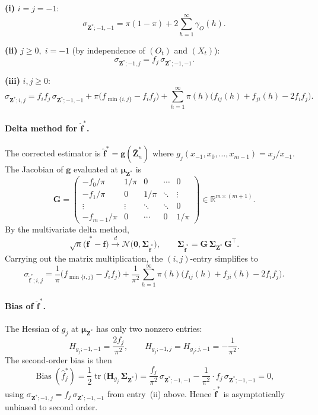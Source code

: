 \documentclass[12pt,a4paper]{scrreprt}
\DeclareMathOperator{\Bias}{Bias}
\begin{document}
\medskip
\noindent\textbf{(i)} $i = j = -1$:
\[
    \sigma_{\mathbf{Z}^{*};-1,-1}
    = \pi(1-\pi) + 2\sum_{h=1}^{\infty}\gamma_O(h).
\]

\noindent\textbf{(ii)} $j \geq 0,\; i = -1$ (by independence of $(O_t)$ and $(X_t)$):
\[
    \sigma_{\mathbf{Z}^{*};-1,j}
    = f_j\,\sigma_{\mathbf{Z}^{*};-1,-1}.
\]

\noindent\textbf{(iii)} $i, j \geq 0$:
\[
    \sigma_{\mathbf{Z}^{*};i,j}
    = f_i f_j\,\sigma_{\mathbf{Z}^{*};-1,-1}
    + \pi\bigl(f_{\min\{i,j\}} - f_i f_j\bigr)
    + \sum_{h=1}^{\infty}\pi(h)\bigl(f_{ij}(h) + f_{ji}(h) - 2f_i f_j\bigr).
\]

\paragraph{Delta method for $\hat{\mathbf{f}}^{*}$.}
The corrected estimator is $\hat{\mathbf{f}}^{*} = \mathbf{g}(\bar{\mathbf{Z}}_n^{*})$ where
$g_j(x_{-1}, x_0, \ldots, x_{m-1}) = x_j / x_{-1}$. The Jacobian of $\mathbf{g}$ evaluated
at $\boldsymbol{\mu}_{\mathbf{Z}^{*}}$ is
\[
    \mathbf{G} =
    \begin{pmatrix}
        -f_0/\pi    & 1/\pi  & 0      & \cdots & 0      \\
        -f_1/\pi    & 0      & 1/\pi  & \ddots & \vdots \\
        \vdots      & \vdots & \ddots & \ddots & 0      \\
        -f_{m-1}/\pi& 0      & \cdots & 0      & 1/\pi
    \end{pmatrix}
    \in \mathbb{R}^{m \times (m+1)}.
\]
By the multivariate delta method,
\[
    \sqrt{n}\bigl(\hat{\mathbf{f}}^{*} - \mathbf{f}\bigr)
    \xrightarrow{d} \mathcal{N}\bigl(\mathbf{0}, \boldsymbol{\Sigma}_{\hat{\mathbf{f}}^{*}}\bigr),
    \qquad
    \boldsymbol{\Sigma}_{\hat{\mathbf{f}}^{*}} = \mathbf{G}\,\boldsymbol{\Sigma}_{\mathbf{Z}^{*}}\,\mathbf{G}^{\top}.
\]
Carrying out the matrix multiplication, the $(i,j)$-entry simplifies to
\[
    \sigma_{\hat{\mathbf{f}}^{*};i,j}
    = \frac{1}{\pi}\bigl(f_{\min\{i,j\}} - f_i f_j\bigr)
    + \frac{1}{\pi^2}\sum_{h=1}^{\infty}\pi(h)
    \bigl(f_{ij}(h) + f_{ji}(h) - 2f_i f_j\bigr).
\]

\paragraph{Bias of $\hat{\mathbf{f}}^{*}$.}
The Hessian of $g_j$ at $\boldsymbol{\mu}_{\mathbf{Z}^{*}}$ has only two nonzero entries:
\[
    H_{g_j;-1,-1} = \frac{2f_j}{\pi^2}, \qquad
    H_{g_j;-1,j} = H_{g_j;j,-1} = -\frac{1}{\pi^2}.
\]
The second-order bias is then
\[
    \Bias(\hat{f}_j^{*})
    = \frac{1}{2}\operatorname{tr}\bigl(\mathbf{H}_{g_j}\,\boldsymbol{\Sigma}_{\mathbf{Z}^{*}}\bigr)
    = \frac{f_j}{\pi^2}\,\sigma_{\mathbf{Z}^{*};-1,-1}
    - \frac{1}{\pi^2}\cdot f_j\,\sigma_{\mathbf{Z}^{*};-1,-1}
    = 0,
\]
using $\sigma_{\mathbf{Z}^{*};-1,j} = f_j\,\sigma_{\mathbf{Z}^{*};-1,-1}$ from entry~(ii) above.
Hence $\hat{\mathbf{f}}^{*}$ is asymptotically unbiased to second order.
\end{document}
